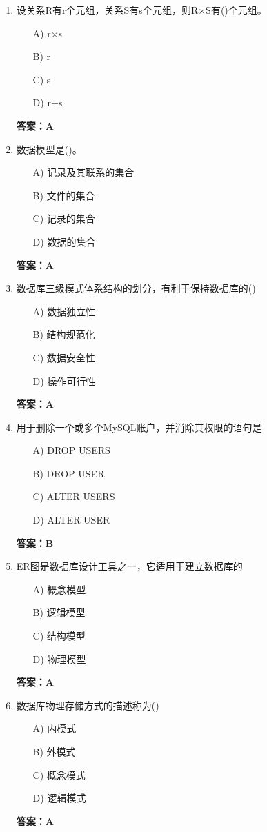 \documentclass[a4paper,12pt]{article}
\begin{document}
\begin{enumerate}[label=\arabic*.]
\item 设关系R有r个元组，关系S有s个元组，则R$\times$S有()个元组。
\begin{itemize}
    \item[A)] r$\times$s
    \item[B)] r
    \item[C)] s
    \item[D)] r+s
\end{itemize}
\textbf{答案：A}

\item 数据模型是()。
\begin{itemize}
    \item[A)] 记录及其联系的集合
    \item[B)] 文件的集合
    \item[C)] 记录的集合
    \item[D)] 数据的集合
\end{itemize}
\textbf{答案：A}

\item 数据库三级模式体系结构的划分，有利于保持数据库的()
\begin{itemize}
    \item[A)] 数据独立性
    \item[B)] 结构规范化
    \item[C)] 数据安全性
    \item[D)] 操作可行性
\end{itemize}
\textbf{答案：A}

\item 用于删除一个或多个MySQL账户，并消除其权限的语句是
\begin{itemize}
    \item[A)] DROP USERS
    \item[B)] DROP USER
    \item[C)] ALTER USERS
    \item[D)] ALTER USER
\end{itemize}
\textbf{答案：B}

\item ER图是数据库设计工具之一，它适用于建立数据库的
\begin{itemize}
    \item[A)] 概念模型
    \item[B)] 逻辑模型
    \item[C)] 结构模型
    \item[D)] 物理模型
\end{itemize}
\textbf{答案：A}

\item 数据库物理存储方式的描述称为()
\begin{itemize}
    \item[A)] 内模式
    \item[B)] 外模式
    \item[C)] 概念模式
    \item[D)] 逻辑模式
\end{itemize}
\textbf{答案：A}


\end{enumerate}
\end{document}
